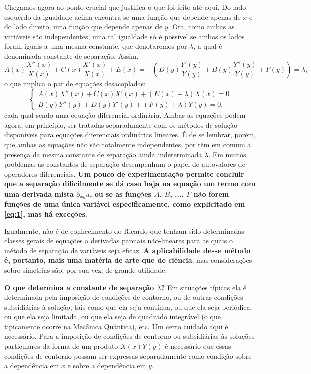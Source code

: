\documentclass[10pt,a4paper]{article}
\begin{document}
	Chegamos agora ao ponto crucial que justifica o que foi feito até aqui. Do lado esquerdo da igualdade acima encontra-se uma função que depende apenas de $x$ e do lado direito, uma função que depende apenas de $y$. Ora, como ambas as variáveis são independentes, uma tal igualdade só é possível se ambos os lados foram iguais a uma mesma constante, que denotaremos por $\lambda$, a qual é denominada constante de separação. Assim,
		\begin{equation}
		A(x)\frac{X''(x)}{X(x)} + C(x)\frac{X'(x)}{X(x)} + E(x) = -\left(D(y)\frac{Y'(y)}{Y(y)} + B(y)\frac{Y''(y)}{Y(y)} + F(y)\right) = \lambda,
		\label{eq:5}
	\end{equation}
	o que implica o par de equações desacopladas:
	\begin{equation}
		\begin{cases}
			A(x)X''(x) + C(x)X'(x) + (E(x)-\lambda)X(x) = 0\\
			B(y)Y''(y) + D(y)Y'(y) + (F(y)+\lambda)Y(y) = 0,
		\end{cases}
	\end{equation}
	cada qual sendo uma equação diferencial ordinária. Ambas as equações podem agora, em princípio, ser tratadas separadamente com os métodos de solução disponíveis para equações diferenciais ordinárias lineares. É de se lembrar, porém, que ambas as equações não são totalmente independentes, por têm em comum a presença da mesma constante de separação ainda indeterminada $\lambda$. Em muitos problemas as constantes de separação desempenham o papel de autovalores de operadores diferenciais. \textbf{Um pouco de experimentação permite concluir que a separação dificilmente se dá caso haja na equação um termo com uma derivada mista $\partial_{xy}u$, ou se as funções $A$, $B$, ..., $F$ não forem funções de uma única variável especificamente, como explicitado em \ref{eq:1}, mas há exceções}.
	
	Igualmente, não é de conhecimento do Ricardo que tenham sido determinadas classes gerais de equações a derivadas parciais não-lineares para as quais o método de separação de variáveis seja eficaz. \textbf{A aplicabilidade desse método é, portanto, mais uma matéria de arte que de ciência}, mas considerações sobre simetrias são, por sua vez, de grande utilidade.
	
	\textbf{O que determina a constante de separação $\lambda$?} Em situações típicas ela é determinada pela imposição de condições de contorno, ou de outras condições subsidiárias à solução, tais como que ela seja contínua, ou que ela seja periódica, ou que ela seja limitada, ou que ela seja de quadrado integrável (o que tipicamente ocorre na Mecânica Quântica), etc. Um certo cuidado aqui é necessário. Para a imposição de condições de contorno ou subsidiárias às soluções particulares da forma de um produto $X(x)Y(y)$ é necessário que essas condições de contorno possam ser expressas separadamente como condição sobre a dependência em $x$ e sobre a dependência em $y$.
	
\end{document}

